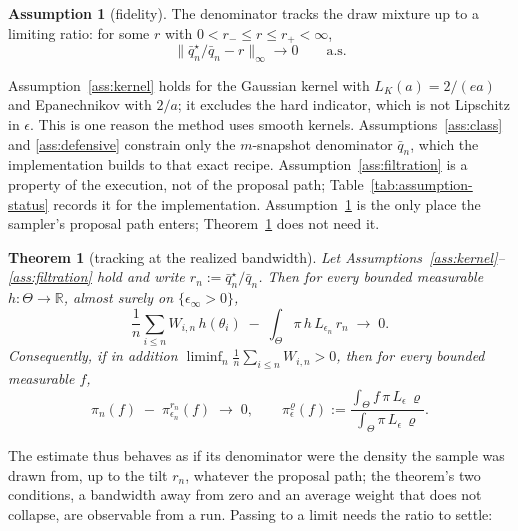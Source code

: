 \documentclass[10pt]{article}
\theoremstyle{plain}
\newtheorem{theorem}{Theorem}
\theoremstyle{definition}
\newtheorem{assumption}{Assumption}
\begin{document}
\begin{assumption}[fidelity]\label{ass:stab} The denominator tracks the draw mixture up to a limiting ratio: for some $r$ with $0<r_-\le r\le r_+<\infty$,
\begin{equation}
\bigl\|\bar q^\star_n/\bar q_n-r\bigr\|_\infty\longrightarrow0\qquad\text{a.s.}
\label{eq:fidelity}
\end{equation}
\end{assumption}

Assumption~\ref{ass:kernel} holds for the Gaussian kernel with $L_K(a)=2/(ea)$ and Epanechnikov with $2/a$; it excludes the hard indicator, which is not Lipschitz in $\epsilon$. This is one reason the method uses smooth kernels. Assumptions~\ref{ass:class} and \ref{ass:defensive} constrain only the $m$-snapshot denominator $\bar q_n$, which the implementation builds to that exact recipe. Assumption~\ref{ass:filtration} is a property of the execution, not of the proposal path; Table~\ref{tab:assumption-status} records it for the implementation. Assumption~\ref{ass:stab} is the only place the sampler's proposal path enters; Theorem~\ref{thm:consistency} does not need it.

\begin{theorem}[tracking at the realized bandwidth]\label{thm:consistency}
Let Assumptions~\ref{ass:kernel}--\ref{ass:filtration} hold and write $r_n:=\bar q^\star_n/\bar q_n$. Then for every bounded measurable $h:\Theta\to\mathbb{R}$, almost surely on $\{\epsilon_\infty>0\}$,
\begin{equation}
\frac1n\sum_{i\le n}W_{i,n}\,h(\theta_i)\;-\;\int_\Theta \pi\,h\,L_{\epsilon_n}\,r_n\;\longrightarrow\;0 .
\label{eq:tracking}
\end{equation}
Consequently, if in addition $\liminf_n\tfrac1n\sum_{i\le n}W_{i,n}>0$, then for every bounded measurable $f$,
\begin{equation}
\widehat\pi_n(f)\;-\;\pi^{r_n}_{\epsilon_n}(f)\;\longrightarrow\;0,
\qquad
\pi^{\varrho}_{\epsilon}(f):=\frac{\int_\Theta f\,\pi\,L_{\epsilon}\,\varrho}{\int_\Theta \pi\,L_{\epsilon}\,\varrho}.
\label{eq:tracking-ratio}
\end{equation}
\end{theorem}

The estimate thus behaves as if its denominator were the density the sample was drawn from, up to the tilt $r_n$, whatever the proposal path; the theorem's two conditions, a bandwidth away from zero and an average weight that does not collapse, are observable from a run. Passing to a limit needs the ratio to settle:
\end{document}

